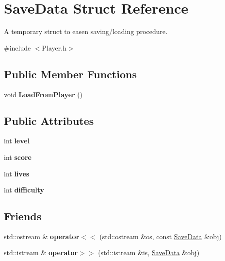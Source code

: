 \hypertarget{struct_save_data}{}\section{Save\+Data Struct Reference}
\label{struct_save_data}


A temporary struct to easen saving/loading procedure.  




{\ttfamily \#include $<$Player.\+h$>$}

\subsection*{Public Member Functions}
\begin{DoxyCompactItemize}
\item 
\mbox{\label{struct_save_data_aadbe80f0e50ca006c4ab551e354dffd4}} 
void {\bfseries Load\+From\+Player} ()
\end{DoxyCompactItemize}
\subsection*{Public Attributes}
\begin{DoxyCompactItemize}
\item 
\mbox{\label{struct_save_data_a97845f98c55e065474a64da106613c64}} 
int {\bfseries level}
\item 
\mbox{\label{struct_save_data_af45bd67901ef6353a5d18853cf12afca}} 
int {\bfseries score}
\item 
\mbox{\label{struct_save_data_a3c77e3bbee8113a1ace50ee6bf5e6563}} 
int {\bfseries lives}
\item 
\mbox{\label{struct_save_data_a54238e0683a22713a69a5bc1bd3cebd6}} 
int {\bfseries difficulty}
\end{DoxyCompactItemize}
\subsection*{Friends}
\begin{DoxyCompactItemize}
\item 
\mbox{\label{struct_save_data_a1bb052bd966adbcac481f7465303bf01}} 
std\+::ostream \& {\bfseries operator$<$$<$} (std\+::ostream \&os, const \hyperlink{struct_save_data}{Save\+Data} \&obj)
\item 
\mbox{\label{struct_save_data_a734fceef19cc9a9c220a1989368fb176}} 
std\+::istream \& {\bfseries operator$>$$>$} (std\+::istream \&is, \hyperlink{struct_save_data}{Save\+Data} \&obj)
\end{DoxyCompactItemize}


